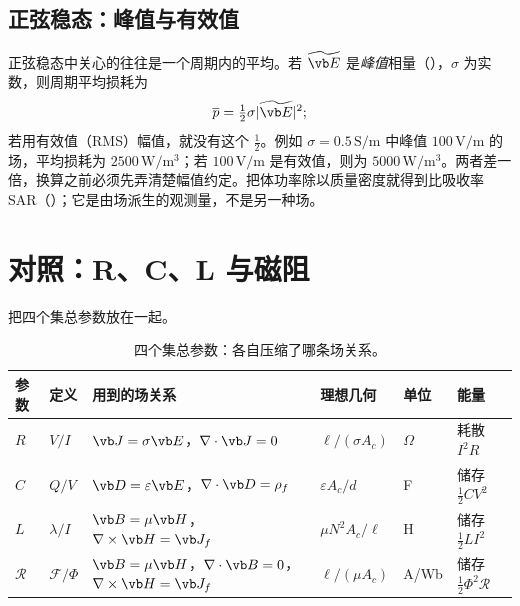 
\subsection{正弦稳态：峰值与有效值}
正弦稳态中关心的往往是一个周期内的平均。若 $\widetilde{\vb E}$ 是\emph{峰值}相量（），$\sigma$ 为实数，则周期平均损耗为
\begin{equation}
\overline p=\tfrac12\sigma|\widetilde{\vb E}|^2 ;
\end{equation}
若用有效值（RMS）幅值，就没有这个 $\tfrac12$。例如 $\sigma=0.5\,\mathrm{S/m}$ 中峰值 $100\,\mathrm{V/m}$ 的场，平均损耗为 $2500\,\mathrm{W/m^3}$；若 $100\,\mathrm{V/m}$ 是有效值，则为 $5000\,\mathrm{W/m^3}$。两者差一倍，换算之前必须先弄清楚幅值约定。把体功率除以质量密度就得到比吸收率 SAR（）；它是由场派生的观测量，不是另一种场。

\section{对照：R、C、L 与磁阻}\label{sec:systems-compare}

 把四个集总参数放在一起。

\begin{table}[htbp]\centering\small
\caption{四个集总参数：各自压缩了哪条场关系。}\label{tab:systems-rclr}
\begin{tabularx}{\linewidth}{@{}l l Y l l Y@{}}
\toprule
参数 & 定义 & 用到的场关系 & 理想几何 & 单位 & 能量\\\midrule
$R$ & $V/I$ & $\vb J=\sigma\vb E$，$\nabla\cdot\vb J=0$ & $\ell/(\sigma A_c)$ & $\Omega$ & 耗散 $I^2R$\\
$C$ & $Q/V$ & $\vb D=\varepsilon\vb E$，$\nabla\cdot\vb D=\rho_f$ & $\varepsilon A_c/d$ & F & 储存 $\tfrac12CV^2$\\
$L$ & $\lambda/I$ & $\vb B=\mu\vb H$，$\nabla\times\vb H=\vb J_f$ & $\mu N^2A_c/\ell$ & H & 储存 $\tfrac12LI^2$\\
$\mathcal R$ & $\mathcal F/\Phi$ & $\vb B=\mu\vb H$，$\nabla\cdot\vb B=0$，$\nabla\times\vb H=\vb J_f$ & $\ell/(\mu A_c)$ & A/Wb & 储存 $\tfrac12\Phi^2\mathcal R$\\
\bottomrule
\end{tabularx}
\end{table}

